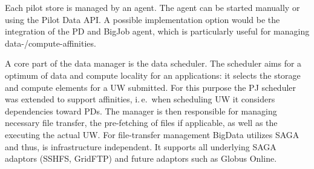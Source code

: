 \documentclass[conference,final]{IEEEtran}
\begin{document}
Each pilot store is managed by an agent. The agent can be started manually or 
using the Pilot Data API. A possible implementation option would be the 
integration of the PD and BigJob agent, which is particularly useful for 
managing data-/compute-affinities.

A core part of the data manager is the data scheduler. The scheduler aims for a
optimum of data and compute locality for an applications: it selects the storage
and compute elements for a UW submitted. For this purpose the PJ scheduler was
extended to support affinities, i.\,e.\ when scheduling UW it considers
dependencies toward PDs. The manager is then responsible for managing necessary
file transfer, the pre-fetching of files if applicable, as well as the executing
the actual UW. For file-transfer management BigData utilizes SAGA and thus, is
infrastructure independent. It supports all underlying SAGA adaptors (SSHFS,
GridFTP) and future adaptors such as Globus Online.



% 


% 
% 
% 
% 
% 
% 
% 
\end{document}
